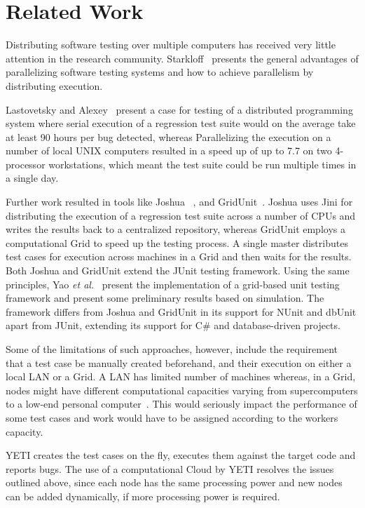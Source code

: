 \section{Related Work}\label{sec:rw}
Distributing software testing over multiple computers has received very little attention in the research community. Starkloff~\cite{stark} presents the general advantages of parallelizing software testing systems and how to achieve parallelism by distributing execution. 

Lastovetsky and Alexey~\cite{lasto} present a case for testing of a distributed programming system where serial execution of a regression test suite would on the average take at least 90 hours per bug detected, whereas Parallelizing the execution on a number of local UNIX computers resulted in a speed up of up to 7.7 on two 4-processor workstations, which meant the test suite could be run multiple times in a single day.

Further work resulted in tools like Joshua ~\cite{Kap}, and GridUnit~\cite{Duarte1, Duarte2, Duarte3}. 
Joshua uses Jini for distributing the execution of a regression test suite across a number of CPUs and 
writes the results back to a centralized repository, whereas GridUnit employs a computational Grid to speed up the testing process. 
A single master distributes test cases for execution across machines in a Grid and then waits for the results.
Both Joshua and GridUnit extend the JUnit testing framework. Using the same principles, Yao \textit{et al.}~\cite{yao} present the implementation of a grid-based unit testing framework and present some preliminary results based on simulation. 
The framework  differs from Joshua and GridUnit in its support for NUnit and dbUnit apart from JUnit, extending its support for C\# and database-driven projects.

Some of the limitations of such approaches, however, include the requirement that a test case be manually created beforehand, and their execution on either a local LAN or a Grid. A LAN has limited number of machines whereas, in a Grid, nodes might have different computational capacities varying from supercomputers to a low-end personal computer~\cite{yao}. This would seriously impact the performance 
of some test cases and work would have to be assigned according to the workers capacity. 


YETI creates the test cases on the fly, executes them against the target code and reports bugs. The use of a computational Cloud by YETI resolves the issues outlined above, since each node has the same processing power and new nodes can be added dynamically, if more processing power is required. 



